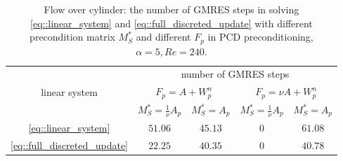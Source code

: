 \documentclass{eajam}
\begin{document}
       \begin{table}[!htbp]
         \centering
         \begin{tabular}{ccccc}
           \toprule
           \multirow{3}{*}{linear system}   &  \multicolumn{4}{c}{number of GMRES steps} \\
           \cline{2-5}
                           & \multicolumn{2}{c}{$F_p = A + W_p^n $} &
                           \multicolumn{2}{c}{$F_p = \nu A + W_p^n $} \\ \midrule
                           & $M_S^* = \frac{1}{\nu}A_p$&  $M_S^* = A_p$ & $M_S^* = \frac{1}{\nu}A_p$  &  $M_S^* = A_p$   \\ \midrule
           \eqref{eq::linear_system}         & $51.06$   & $ 45.13$ &
           $ 0 $   & $61.08$  \\ \midrule           
           \eqref{eq::full_discreted_update} & $22.25$   & $40.35$  & $ 0 $   & $40.78$ 
           \\ \bottomrule 
         \end{tabular}
         \caption{Flow over cylinder: the number of GMRES steps in solving
           \eqref{eq::linear_system} and \eqref{eq::full_discreted_update} with different precondition
           matrix $M_S^*$ and different $F_p$ in PCD preconditioning,
           $\alpha = 5, Re = 240$.}
         \label{tab::GMRES_steps_cylinder}
       \end{table}
      
\end{document}
